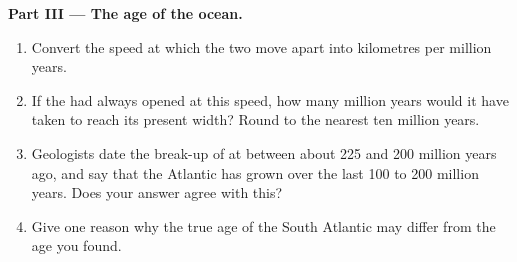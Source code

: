 \begin{problem}
\medskip
\noindent\textbf{Part III --- The age of the ocean.}
\begin{enumerate}[resume]
  \item Convert the speed at which the two  move apart into
        kilometres per million years.
  \item If the  had always opened at this speed, how many million
        years would it have taken to reach its present width? Round to
        the nearest ten million years.
  \item Geologists date the break-up of  at between about 225 and
        200 million years ago, and say that the Atlantic has grown over the
        last 100 to 200 million years. Does your answer agree with this?
  \item Give one reason why the true age of the South Atlantic may differ
        from the age you found.
\end{enumerate}
\end{problem}
